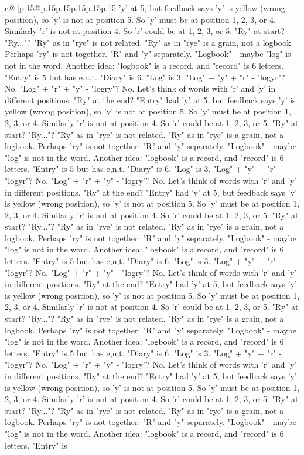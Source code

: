 \documentclass{article}
\begin{document}
{\begin{supertabular}{c@{$\;$}|p{.15\linewidth}@{}p{.15\linewidth}p{.15\linewidth}p{.15\linewidth}p{.15\linewidth}p{.15\linewidth}}
{{{'y' at 5, but feedback says 'y' is yellow (wrong position), so 'y' is not at position 5. So 'y' must be at position 1, 2, 3, or 4. Similarly 'r' is not at position 4. So 'r' could be at 1, 2, 3, or 5. "Ry" at start? "Ry..."? "Ry" as in "rye" is not related. "Ry" as in "rye" is a grain, not a logbook. Perhaps "ry" is not together. "R" and "y" separately. "Logbook" {-} maybe "log" is not in the word. Another idea: "logbook" is a record, and "record" is 6 letters. "Entry" is 5 but has e,n,t. "Diary" is 6. "Log" is 3. "Log" + "y" + "r" {-} "logyr"? No. "Log" + "r" + "y" {-} "logry"? No. Let's think of words with 'r' and 'y' in different positions. "Ry" at the end? "Entry" had 'y' at 5, but feedback says 'y' is yellow (wrong position), so 'y' is not at position 5. So 'y' must be at position 1, 2, 3, or 4. Similarly 'r' is not at position 4. So 'r' could be at 1, 2, 3, or 5. "Ry" at start? "Ry..."? "Ry" as in "rye" is not related. "Ry" as in "rye" is a grain, not a logbook. Perhaps "ry" is not together. "R" and "y" separately. "Logbook" {-} maybe "log" is not in the word. Another idea: "logbook" is a record, and "record" is 6 letters. "Entry" is 5 but has e,n,t. "Diary" is 6. "Log" is 3. "Log" + "y" + "r" {-} "logyr"? No. "Log" + "r" + "y" {-} "logry"? No. Let's think of words with 'r' and 'y' in different positions. "Ry" at the end? "Entry" had 'y' at 5, but feedback says 'y' is yellow (wrong position), so 'y' is not at position 5. So 'y' must be at position 1, 2, 3, or 4. Similarly 'r' is not at position 4. So 'r' could be at 1, 2, 3, or 5. "Ry" at start? "Ry..."? "Ry" as in "rye" is not related. "Ry" as in "rye" is a grain, not a logbook. Perhaps "ry" is not together. "R" and "y" separately. "Logbook" {-} maybe "log" is not in the word. Another idea: "logbook" is a record, and "record" is 6 letters. "Entry" is 5 but has e,n,t. "Diary" is 6. "Log" is 3. "Log" + "y" + "r" {-} "logyr"? No. "Log" + "r" + "y" {-} "logry"? No. Let's think of words with 'r' and 'y' in different positions. "Ry" at the end? "Entry" had 'y' at 5, but feedback says 'y' is yellow (wrong position), so 'y' is not at position 5. So 'y' must be at position 1, 2, 3, or 4. Similarly 'r' is not at position 4. So 'r' could be at 1, 2, 3, or 5. "Ry" at start? "Ry..."? "Ry" as in "rye" is not related. "Ry" as in "rye" is a grain, not a logbook. Perhaps "ry" is not together. "R" and "y" separately. "Logbook" {-} maybe "log" is not in the word. Another idea: "logbook" is a record, and "record" is 6 letters. "Entry" is 5 but has e,n,t. "Diary" is 6. "Log" is 3. "Log" + "y" + "r" {-} "logyr"? No. "Log" + "r" + "y" {-} "logry"? No. Let's think of words with 'r' and 'y' in different positions. "Ry" at the end? "Entry" had 'y' at 5, but feedback says 'y' is yellow (wrong position), so 'y' is not at position 5. So 'y' must be at position 1, 2, 3, or 4. Similarly 'r' is not at position 4. So 'r' could be at 1, 2, 3, or 5. "Ry" at start? "Ry..."? "Ry" as in "rye" is not related. "Ry" as in "rye" is a grain, not a logbook. Perhaps "ry" is not together. "R" and "y" separately. "Logbook" {-} maybe "log" is not in the word. Another idea: "logbook" is a record, and "record" is 6 letters. "Entry" is }}}
\end{supertabular}}
\end{document}
